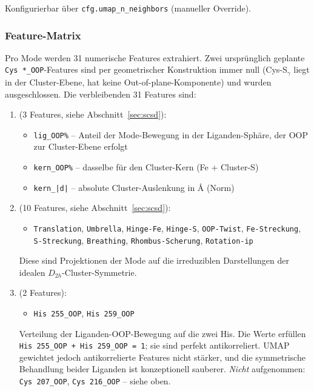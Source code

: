 \documentclass[11pt,a4paper,twoside]{article}
\theoremstyle{remark}
\begin{document}
Konfigurierbar \"uber \texttt{cfg.umap\_n\_neighbors} (manueller
Override).

\subsubsection*{Feature-Matrix}
\label{sec:embedding-features}

Pro Mode werden 31 numerische Features extrahiert. Zwei urspr\"unglich
geplante \texttt{Cys *\_OOP}-Features sind per geometrischer Konstruktion
immer null (Cys-S$_\gamma$ liegt in der Cluster-Ebene, hat keine
Out-of-plane-Komponente) und wurden ausgeschlossen. Die verbleibenden 31
Features sind:

\begin{enumerate}\setlength{\itemsep}{0pt}\setlength{\parsep}{0pt}
  \item[\textbf{Cluster-Ring-Anteile}] (3 Features, siehe
        Abschnitt~\ref{sec:scsd}):
        \begin{itemize}\setlength{\itemsep}{0pt}
          \item \texttt{lig\_OOP\%} -- Anteil der Mode-Bewegung in der
                Liganden-Sph\"are, der OOP zur Cluster-Ebene erfolgt
          \item \texttt{kern\_OOP\%} -- dasselbe f\"ur den
                Cluster-Kern (Fe + Cluster-S)
          \item \texttt{kern\_|d|} -- absolute Cluster-Auslenkung in
                \AA{} (Norm)
        \end{itemize}

  \item[\textbf{Kern-Scores / D$_{2h}$-Irreps}] (10 Features, siehe
        Abschnitt~\ref{sec:scsd}):
        \begin{itemize}\setlength{\itemsep}{0pt}
          \item \texttt{Translation}, \texttt{Umbrella},
                \texttt{Hinge-Fe}, \texttt{Hinge-S},
                \texttt{OOP-Twist}, \texttt{Fe-Streckung},
                \texttt{S-Streckung}, \texttt{Breathing},
                \texttt{Rhombus-Scherung}, \texttt{Rotation-ip}
        \end{itemize}
        Diese sind Projektionen der Mode auf die irreduziblen
        Darstellungen der idealen $D_{2h}$-Cluster-Symmetrie.

  \item[\textbf{Liganden OOP-Anteile}] (2 Features):
        \begin{itemize}\setlength{\itemsep}{0pt}
          \item \texttt{His 255\_OOP}, \texttt{His 259\_OOP}
        \end{itemize}
        Verteilung der Liganden-OOP-Bewegung auf die zwei His. Die
        Werte erf\"ullen \texttt{His 255\_OOP + His 259\_OOP = 1}; sie
        sind perfekt antikorreliert. UMAP gewichtet jedoch
        antikorrelierte Features nicht st\"arker, und die symmetrische
        Behandlung beider Liganden ist konzeptionell sauberer.
        \emph{Nicht} aufgenommen: \texttt{Cys 207\_OOP},
        \texttt{Cys 216\_OOP} -- siehe oben.


\end{enumerate}
\end{document}
